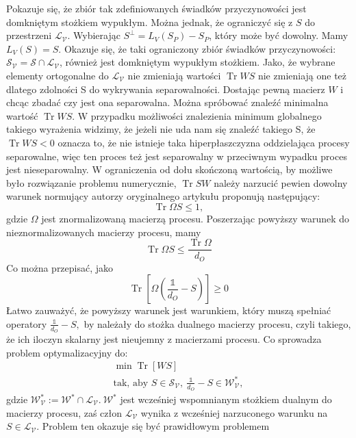 \documentclass[10pt]{article} %
\DeclareMathOperator{\Trs}{Tr}
\newcommand{\I}{\mathbb{1}}
\begin{document}
Pokazuje się, że zbiór tak zdefiniowanych świadków przyczynowości jest domkniętym stożkiem wypukłym. Można jednak, że ograniczyć się z $S$ do przestrzeni 
$\mathcal{L_V}$. Wybierając $S^\bot = L_V(S_P) - S_P$, który może być dowolny. Mamy $L_V(S) = S$. Okazuje się, że taki ograniczony zbiór świadków przyczynowości: $\mathcal{S_V} = \mathcal{S} \cap \mathcal{L_V}$, również jest domkniętym wypukłym stożkiem. Jako, że wybrane elementy ortogonalne do
$\mathcal{L_V}$ nie zmieniają wartości $\Trs WS$ nie zmieniają one też dlatego zdolności S do wykrywania separowalności. 
Dostając pewną macierz $W$ i chcąc zbadać czy jest ona separowalna. Można spróbować znaleźć minimalna wartość $\Trs WS$. W przypadku możliwości 
znalezienia minimum globalnego takiego wyrażenia widzimy, że jeżeli nie uda nam się znaleźć takiego S, że $\Trs WS < 0$ oznacza to, że nie istnieje
taka hiperpłaszczyzna oddzielająca procesy separowalne, więc ten proces też jest separowalny w przeciwnym wypadku proces jest nieseparowalny.
W ograniczenia od dołu skończoną wartością, by możliwe było rozwiązanie problemu numerycznie, $\Trs SW$ należy narzucić pewien dowolny warunek normujący
autorzy oryginalnego artykułu proponują następujący:
\begin{equation}
\Trs \Omega S \leq 1,
\end{equation}
gdzie $\Omega$ jest znormalizowaną macierzą procesu.
Poszerzając powyższy warunek do nieznormalizowanych macierzy procesu, mamy
\begin{equation}
\Trs \Omega S \leq \frac{\Trs \Omega}{d_O}
\end{equation}
Co można przepisać, jako 
\begin{equation}
\Trs \left[ \Omega(\frac{\I}{d_O} -S) \right] \geq 0
\end{equation}
Łatwo zauważyć, że powyższy warunek jest warunkiem, który muszą spełniać operatory $\frac{\I}{d_O} - S,$ by należały do stożka dualnego macierzy procesu, czyli takiego, że ich iloczyn skalarny jest nieujemny z macierzami procesu. Co sprowadza problem optymalizacyjny do:
\begin{gather}
\min \Trs \left[ WS \right]\\
\text{tak, aby } S \in \mathcal{S_V},~ \frac{\I}{d_O} - S \in \mathcal{W^*_V},
\end{gather}
gdzie $\mathcal{W^*_V}:=\mathcal{W^*} \cap \mathcal{L_V}.~ \mathcal{W^*}$ jest wcześniej wspomnianym stożkiem dualnym do macierzy procesu,
zaś człon $\mathcal{L_V}$ wynika z wcześniej narzuconego warunku na $S \in \mathcal{L_V}$. Problem ten okazuje się być prawidłowym problemem
\end{document}
